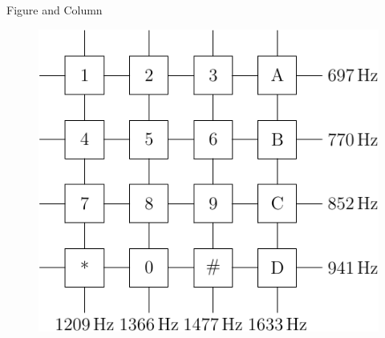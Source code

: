 \documentclass{beamer}
\begin{document}
\begin{frame}{Figure and Column}
    \begin{minipage}[c]{0.3\linewidth}
    \end{minipage}\hspace{1cm}
    \begin{minipage}{0.5\linewidth}
        \medskip
        \begin{figure}[h]
            \centering
            \includegraphics[height=.4\textheight]{pic/dtmf.pdf}
        \end{figure}
    \end{minipage}
\end{frame}
\end{document}
